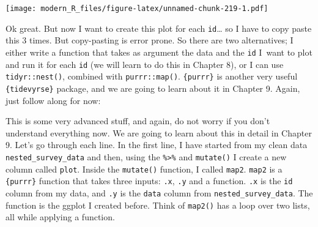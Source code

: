 \documentclass[]{gitbook}
\newenvironment{Shaded}{\begin{snugshade}}{\end{snugshade}}
\newcommand{\DataTypeTok}[1]{\textcolor[rgb]{0.13,0.29,0.53}{#1}}
\newcommand{\KeywordTok}[1]{\textcolor[rgb]{0.13,0.29,0.53}{\textbf{#1}}}
\newcommand{\NormalTok}[1]{#1}
\newcommand{\OperatorTok}[1]{\textcolor[rgb]{0.81,0.36,0.00}{\textbf{#1}}}
\newcommand{\StringTok}[1]{\textcolor[rgb]{0.31,0.60,0.02}{#1}}
\theoremstyle{definition}
\theoremstyle{definition}
\theoremstyle{definition}
\theoremstyle{remark}
\begin{document}
\texttt{[image: modern\_R\_files/figure-latex/unnamed-chunk-219-1.pdf]}

Ok great. But now I want to create this plot for each
\texttt{id}\ldots{} so I have to copy paste this 3 times. But
copy-pasting is error prone. So there are two alternatives; I either
write a function that takes as argument the data and the \texttt{id}
I~want to plot and run it for each \texttt{id} (we will learn to do this
in Chapter 8), or I can use \texttt{tidyr::nest()}, combined with
\texttt{purrr::map()}. \texttt{\{purrr\}} is another very useful
\texttt{\{tidevyrse\}} package, and we are going to learn about it in
Chapter 9. Again, just follow along for now:

\begin{Shaded}
\end{Shaded}

This is some very advanced stuff, and again, do not worry if you don't
understand everything now. We are going to learn about this in detail in
Chapter 9. Let's go through each line. In the first line, I have started
from my clean data \texttt{nested\_survey\_data} and then, using the
\texttt{\%\textgreater{}\%} and \texttt{mutate()} I create a new column
called \texttt{plot}. Inside the \texttt{mutate()} function, I called
\texttt{map2}. \texttt{map2} is a \texttt{\{purrr\}} function that takes
three inputs: \texttt{.x}, \texttt{.y} and a function. \texttt{.x} is
the \texttt{id} column from my data, and \texttt{.y} is the
\texttt{data} column from \texttt{nested\_survey\_data}. The function is
the ggplot I created before. Think of \texttt{map2()} has a loop over
two lists, all while applying a function.
\end{document}
